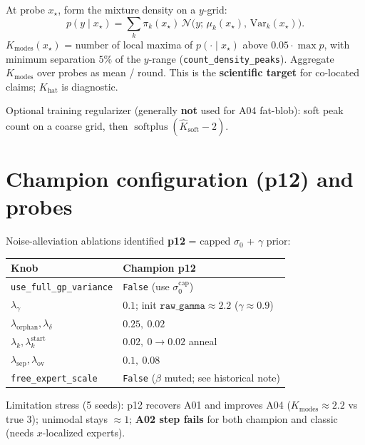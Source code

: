 \documentclass[11pt,a4paper]{article}
\newcommand{\Ncal}{\mathcal{N}}
\newcommand{\softplus}{\operatorname{softplus}}
\newcommand{\Khat}{K_{\mathrm{hat}}}
\newcommand{\Kmodes}{K_{\mathrm{modes}}}
\begin{document}
At probe \(x_\star\), form the mixture density on a \(y\)-grid:
\begin{equation}
  p(y\mid x_\star)
  =
  \sum_k
  \pi_k(x_\star)\,
  \Ncal\!\bigl(y;\,\mu_k(x_\star),\,\mathrm{Var}_k(x_\star)\bigr).
\end{equation}
\(\Kmodes(x_\star)\) = number of local maxima of \(p(\cdot\mid x_\star)\) above
\(0.05\cdot\max p\), with minimum separation \(5\%\) of the \(y\)-range
(\texttt{count\_density\_peaks}). Aggregate \(\Kmodes\) over probes as mean / round.
This is the \textbf{scientific target} for co-located claims; \(\Khat\) is diagnostic.

Optional training regularizer (generally \textbf{not} used for A04 fat-blob):
soft peak count on a coarse grid, then \(\softplus(\widehat K_{\mathrm{soft}}-2)\).

\section{Champion configuration (p12) and probes}

Noise-alleviation ablations identified \textbf{p12} = capped \(\sigma_0\) + \(\gamma\) prior:

\begin{center}
\begin{tabular}{@{}ll@{}}
\toprule
Knob & Champion p12 \\
\midrule
\texttt{use\_full\_gp\_variance} & \texttt{False} (use \(\sigma_0^{\mathrm{cap}}\)) \\
\(\lambda_{\gamma}\) & \(0.1\); init \(\texttt{raw\_gamma}\approx 2.2\) (\(\gamma\approx 0.9\)) \\
\(\lambda_{\mathrm{orphan}},\lambda_{\delta}\) & \(0.25,\ 0.02\) \\
\(\lambda_k,\lambda_k^{\mathrm{start}}\) & \(0.02,\ 0\to 0.02\) anneal \\
\(\lambda_{\mathrm{sep}},\lambda_{\mathrm{ov}}\) & \(0.1,\ 0.08\) \\
\texttt{free\_expert\_scale} & \texttt{False} (\(\beta\) muted; see historical note) \\
\bottomrule
\end{tabular}
\end{center}

Limitation stress (5 seeds): p12 recovers A01 and improves A04
(\(\Kmodes\approx 2.2\) vs true \(3\)); unimodal stays \(\approx 1\);
\textbf{A02 step fails} for both champion and classic (needs \(x\)-localized experts).
\end{document}
